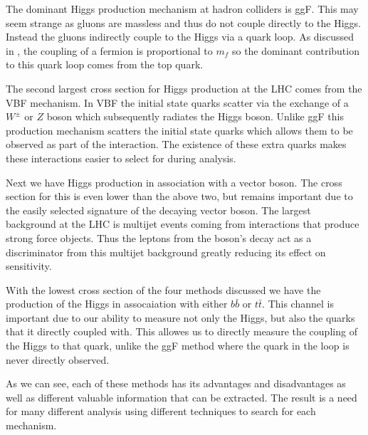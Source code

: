 The dominant Higgs production mechanism at hadron colliders is ggF.  This may
seem strange as gluons are massless and thus do not couple directly to the
Higgs.  Instead the gluons indirectly couple to the Higgs via a quark loop.  As
discussed in , the coupling of a fermion
is proportional to $m_f$ so the dominant contribution to this quark loop comes
from the top quark.  

The second largest cross section for Higgs production at the LHC comes from the VBF
mechanism.  In VBF the initial state quarks scatter via the exchange of a
$W^{\pm}$ or $Z$ boson which subsequently radiates the Higgs boson.  Unlike ggF
this production mechanism scatters the initial state quarks which allows them to
be observed as part of the interaction.  The existence of these extra quarks
makes these interactions easier to select for during analysis.

Next we have Higgs production in association with a vector boson. The cross
section for this is even lower than the above two, but remains important due to
the easily selected signature of the decaying vector boson.  The largest
background at the LHC is multijet events coming from interactions that
produce strong force objects.  Thus the leptons from the boson's decay act as a
discriminator from this multijet background greatly reducing its effect on
sensitivity.

With the lowest cross section of the four methods discussed we have the production of
the Higgs in assocaiation with either $b\bar{b}$ or $t\bar{t}$.  This channel is
important due to our ability to measure not only the Higgs, but also the quarks
that it directly coupled with.  This allowes us to directly measure the coupling of
the Higgs to that quark, unlike the ggF method where the quark in the loop is
never directly observed.

As we can see, each of these methods has its advantages and disadvantages as
well as different valuable information that can be extracted.  The result is a
need for many different analysis using different techniques to search for each
mechanism.

